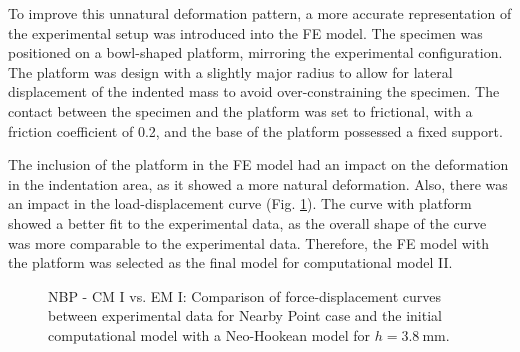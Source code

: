 To improve this unnatural deformation pattern, a more accurate representation of the 
experimental setup was introduced into the FE model. The specimen was positioned on a bowl-shaped
platform, mirroring the experimental configuration. The platform was design with a slightly major radius to allow 
for lateral displacement of the indented mass to avoid over-constraining the specimen. The contact 
between the specimen and the platform was set to frictional, with a friction coefficient of 0.2, and the base of the platform 
possessed a fixed support.

The inclusion of the platform in the FE model had an impact on the deformation in the indentation area, 
as it showed a more natural deformation. Also, there was an impact in the load-displacement curve (Fig. \ref{fig:noplatformvsplatform}). 
The curve with platform showed a better fit to the experimental data, as the overall shape of the curve was more 
comparable to the experimental data. Therefore, the FE model with the platform was selected as the final model for computational 
model II.\\
\begin{figure}%
    \centering
   \quad
   \caption[CP II: No platform vs. with platform]{NBP - CM I vs. EM I: Comparison of force-displacement curves between experimental data for Nearby Point case and the initial computational model with a Neo-Hookean model for $h = \SI{3.8}{\milli \meter}$.}%
   \label{fig:noplatformvsplatform}%
\end{figure}

